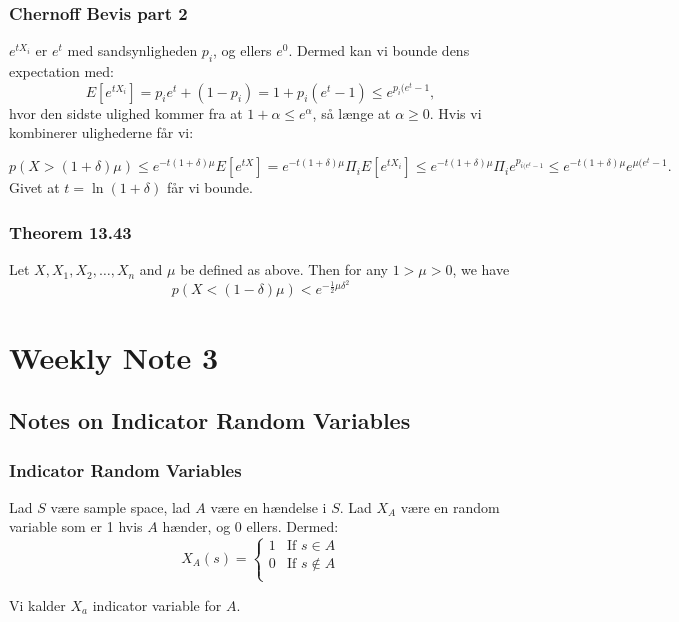 \documentclass{beamer}
\begin{document}
\begin{frame}
  \frametitle{Chernoff Bevis part 2}
  
$e^{tX_{i}}$ er $e^{t}$ med sandsynligheden $p_{i}$, og ellers $e^{0}$. Dermed kan vi bounde dens expectation med:
\begin{equation}
  \label{}
E \left[ e^{tX_{i}} \right] = p_{i}e^{t}+ (1-p_{i})=1+p_{i}(e^{t}-1) \leq e^{p_{i}(e^{t}-1},
\end{equation}
hvor den sidste ulighed kommer fra at $1 + \alpha \leq e^{\alpha}$, så længe at $\alpha \geq 0$.
Hvis vi kombinerer ulighederne får vi:

\begin{equation}
  \label{}
p(X > (1 + \delta) \mu) \leq e^{-t(1 + \delta) \mu} E \left[ e^{tX} \right] = e^{-t(1+\delta) \mu} \Pi_{i} E \left[ e^{tX_{i}} \right] \leq e^{-t(1 + \delta) \mu} \Pi_{i} e^{p_{i(e^{t}-1}} \leq e^{-t(1+\delta) \mu}e^{\mu(e^{t}-1}.
\end{equation}
Givet at $t = \ln(1+\delta)$ får vi bounde.
\end{frame}

\begin{frame}
  \frametitle{Theorem 13.43}
 \begin{theorem}
   Let $X, X_{1}, X_{2}, \ldots, X_{n}$ and $\mu$ be defined as above. Then for any $1 > \mu > 0$, we have
   \begin{equation}
     \label{}
p(X < (1- \delta) \mu ) < e^{- \frac{1}{2} \mu \delta^{2}}
   \end{equation}

 \end{theorem} 
\end{frame}

\section{Weekly Note 3}
\label{sec:label}

\subsection{Notes on Indicator Random Variables}
\label{subsec:label}

\begin{frame}
  \frametitle{Indicator Random Variables}
  Lad $S$ være sample space, lad $A$ være en hændelse i $S$. Lad $X_{A}$ være en random variable som er 1 hvis $A$ hænder, og 0 ellers. Dermed:
  \begin{equation}
    \label{}
X_{A}(s) = \begin{cases}
  1 & \text{If } s \in A \\
  0 & \text{If } s \notin A \\
\end{cases}
  \end{equation}

  Vi kalder $X_{a}$ indicator variable for $A$.

\end{frame}
\end{document}
